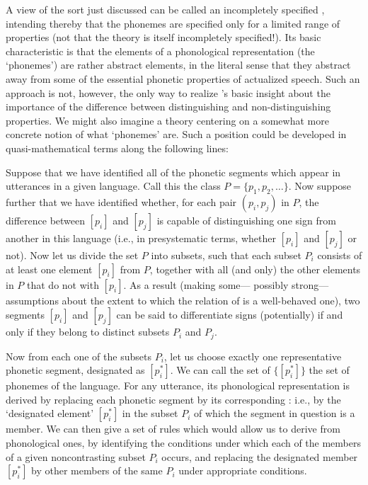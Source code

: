 A view of the sort just discussed can be called an incompletely
specified , intending thereby that the phonemes are
specified only for a limited range of properties (not that the theory
is itself incompletely specified!). Its basic characteristic is that
the elements of a phonological representation (the `phonemes') are
rather abstract elements, in the literal sense that they abstract away
from some of the essential phonetic properties of actualized
speech. Such an approach is not, however, the only way to realize
{\Saussure}'s basic insight about the importance of the difference
between distinguishing and non-distin\-guish\-ing properties. We might
also imagine a theory centering on a somewhat more concrete notion of
what `phonemes' are. Such a position could be developed in
quasi-mathematical terms along the following lines:

Suppose that we have identified all of the phonetic segments which
appear in utterances in a given language. Call this the class
$P = \{p_{1}, p_{2}, \ldots\}$. Now suppose further that we have
identified whether, for each pair $(p_{i}, p_{j})$ in $P$, the
difference between $[p_{i}]$ and $[p_{j}]$ is capable of
distinguishing one sign from another in this language (i.e., in
presystematic terms, whether $[p_{i}]$ and $[p_{j}]$  or
not). Now let us divide the set $P$ into subsets, such that each
subset $P_{i}$ consists of at least one element $[p_{i}]$ from $P$,
together with all (and only) the other elements in $P$ that do not
 with $[p_{i}]$. As a result (making some— possibly
strong—assumptions about the extent to which the relation of 
is a well-behaved one), two segments $[p_{i}]$ and $[p_{j}]$ can be
said to differentiate signs (potentially) if and only if they belong
to distinct subsets $P_{i}$ and $P_{j}$.

Now from each one of the subsets $P_{i}$, let us choose exactly one
representative phonetic segment, designated as $[p_{i}^{*}]$. We can
call the set of $\{[p_{i}^{*}]\}$ the set of phonemes of the
language. For any utterance, its phonological representation is
derived by replacing each phonetic segment by its corresponding
: i.e., by the `designated element' $[p_{i}^{*}]$ in the subset
$P_{i}$ of which the segment in question is a member. We can then give
a set of {rules} which would allow us to derive 
from phonological ones, by identifying the conditions under which each
of the members of a given noncontrasting subset $P_{i}$ occurs, and
replacing the designated member $[p_{i}^{*}]$ by other members of the
same $P_{i}$ under appropriate conditions.

